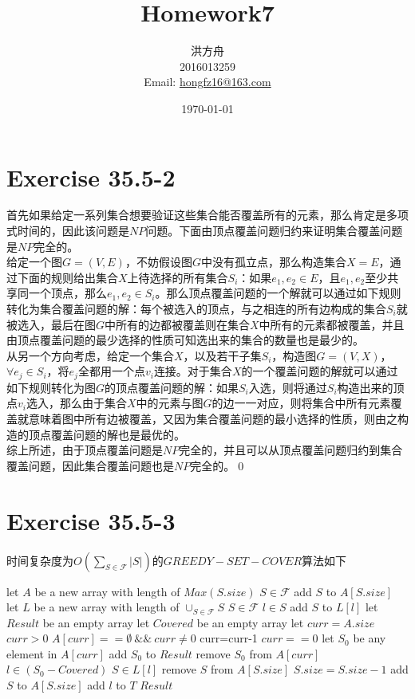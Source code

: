 \documentclass{article}
\title{Homework7}
\author{洪方舟\\2016013259\\Email: \href{mailto:hongfz16@163.com}{hongfz16@163.com}}
\date{\today}
\begin{document}
  \maketitle
  \section*{Exercise 35.5-2}
  \indent 首先如果给定一系列集合想要验证这些集合能否覆盖所有的元素，那么肯定是多项式时间的，因此该问题是$NP$问题。下面由顶点覆盖问题归约来证明集合覆盖问题是$NP$完全的。\\
  \indent 给定一个图$G=(V,E)$，不妨假设图$G$中没有孤立点，那么构造集合$X=E$，通过下面的规则给出集合$X$上待选择的所有集合$S_i$：如果$e_1,e_2 \in E$，且$e_1,e_2$至少共享同一个顶点，那么$e_1,e_2 \in S_i$。那么顶点覆盖问题的一个解就可以通过如下规则转化为集合覆盖问题的解：每个被选入的顶点，与之相连的所有边构成的集合$S_i$就被选入，最后在图$G$中所有的边都被覆盖则在集合$X$中所有的元素都被覆盖，并且由顶点覆盖问题的最少选择的性质可知选出来的集合的数量也是最少的。\\
  \indent 从另一个方向考虑，给定一个集合$X$，以及若干子集$S_i$，构造图$G=(V,X)$，$\forall e_j \in S_i$，将$e_j$全都用一个点$v_i$连接。对于集合$X$的一个覆盖问题的解就可以通过如下规则转化为图$G$的顶点覆盖问题的解：如果$S_i$入选，则将通过$S_i$构造出来的顶点$v_i$选入，那么由于集合$X$中的元素与图$G$的边一一对应，则将集合中所有元素覆盖就意味着图中所有边被覆盖，又因为集合覆盖问题的最小选择的性质，则由之构造的顶点覆盖问题的解也是最优的。\\
  \indent 综上所述，由于顶点覆盖问题是$NP$完全的，并且可以从顶点覆盖问题归约到集合覆盖问题，因此集合覆盖问题也是$NP$完全的。\qed
  \newpage
  \section*{Exercise 35.5-3}
  \noindent 时间复杂度为$O(\sum_{S\in \mathcal{F}}|S|)$的$GREEDY-SET-COVER$算法如下
  \begin{codebox}
  	\li let $A$ be a new array with length of $Max(S.size)$
  	\li \For $S \in \mathcal{F}$
  	\li \Do add $S$ to $A[S.size]$
  	\End
  	\li let $L$ be a new array with length of $\cup_{S \in \mathcal{F}}S$
  	\li \For $S\in \mathcal{F}$
  	\li \Do \For $l \in S$
  	\li \Do add $S$ to $L[l]$
  	\End \End
  	\li let $Result$ be an empty array
  	\li let $Covered$ be an empty array
  	\li let $curr=A.size$
  	\li \While $curr>0$
  	\li \Do \While $A[curr]==\emptyset \:\&\&\: curr\neq 0$
  	\li \Do curr=curr-1 \End
  	\li \If $curr==0$
  	\li \Do {} \End
  	\li let $S_0$ be any element in $A[curr]$
  	\li add $S_0$ to $Result$
  	\li remove $S_0$ from $A[curr]$
  	\li \For $l \in (S_0-Covered)$
  	\li \Do \For $S \in L[l]$
  	\li \Do remove $S$ from $A[S.size]$
  	\li $S.size=S.size-1$
  	\li add $S$ to $A[S.size]$
  	\End
  	\li add $l$ to $T$
  	\End \End
  	\li {} $Result$
  \end{codebox}
\end{document}
